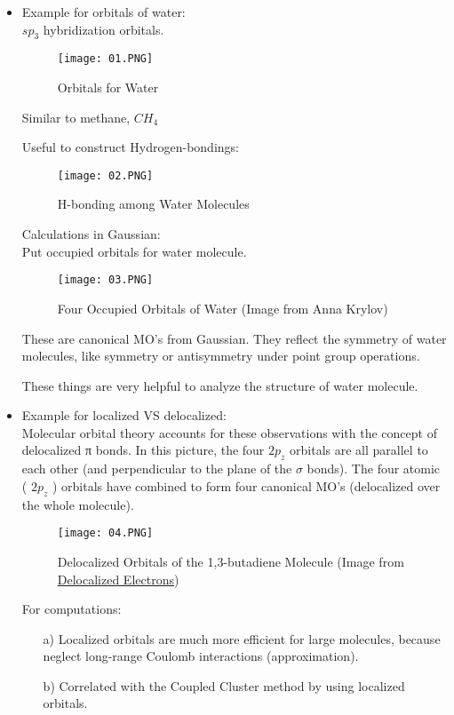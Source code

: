 \documentclass[a4paper, 12pt]{article}
\begin{document}
\begin{itemize}
\item Example for orbitals of water: \\
\tab $sp_3$ hybridization orbitals.
\begin{figure}[H]
        \centering
        \texttt{[image: 01.PNG]}
        \caption{Orbitals for Water}
        \label{fig:sub-first2}
\end{figure}
Similar to methane, $CH_4$

Useful to construct Hydrogen-bondings:
\begin{figure}[H]
        \centering
        \texttt{[image: 02.PNG]}
        \caption{H-bonding among Water Molecules}
        \label{fig:sub-first2}
\end{figure}
Calculations in Gaussian:\\
\tab Put occupied orbitals for water molecule.
\begin{figure}[H]
        \centering
        \texttt{[image: 03.PNG]}
        \caption{Four Occupied Orbitals of Water (Image from Anna Krylov)}
        \label{fig:sub-first2}
\end{figure}
\tab These are canonical MO's from Gaussian. They reflect the symmetry of water molecules, like symmetry or antisymmetry under point group operations.

\tab These things are very helpful to analyze the structure of water molecule. 


\item Example for localized VS delocalized: \\
	\tab Molecular orbital theory accounts for these observations with the concept of delocalized π bonds. In this picture, the four $2p_z$ orbitals are all parallel to each other (and perpendicular to the plane of the  $\sigma$  bonds). The four atomic ( $2p_z$ ) orbitals have combined to form four canonical MO's (delocalized over the whole molecule).
	\begin{figure}[H]
        \centering
        \texttt{[image: 04.PNG]}
        \caption{Delocalized Orbitals of the 1,3-butadiene Molecule (Image from \href{https://chem.libretexts.org/Bookshelves/General_Chemistry/Map\%3A_General_Chemistry_(Petrucci_et_al.)/11\%3A_Chemical_Bonding_II\%3A_Additional_Aspects/11.6\%3A_Delocalized_Electrons\%3A_Bonding_in_the_Benzene_Molecule}{Delocalized Electrons})}
        \label{fig:sub-first2}
\end{figure}
For computations:
\begin{itemize}
\item[a)] Localized orbitals are much more efficient for large molecules, because neglect long-range Coulomb interactions (approximation). 
\item[b)] Correlated with the Coupled Cluster method by using localized orbitals.
\end{itemize}
\end{itemize}
\end{document}
